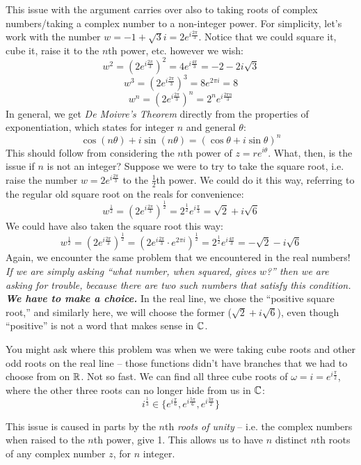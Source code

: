 \documentclass[12pt]{scrartcl}
\begin{document}
This issue with the argument carries over also to taking roots of complex numbers/taking a complex number to a non-integer power. For simplicity, let's work with the number $w = -1 + \sqrt{3} i = 2 e^{i\frac{2\pi}{3}}$. Notice that we could square it, cube it, raise it to the $n$th power, etc. however we wish:
\[
	w^2 = \left(2 e^{i\frac{2\pi}{3}} \right)^2 = 4 e^{i \frac{4\pi}{3}} = -2 - 2i \sqrt{3}
\]
\[
	w^3 = \left(2 e^{i\frac{2\pi}{3}}\right)^3 = 8 e^{2\pi i} = 8
\]
\[
	w^n = \left(2 e^{i\frac{2\pi}{3}} \right)^n = 2^n e^{i \frac{2\pi n}{3}}
\]
In general, we get \textit{De Moivre's Theorem} directly from the properties of exponentiation, which states for integer $n$ and general $\theta$:
\[
	\cos(n\theta) + i \sin (n\theta) = \left(\cos \theta + i \sin \theta \right)^n
\]
This should follow from considering the $n$th power of $z = re^{i \theta}$. What, then, is the issue if $n$ is not an integer? Suppose we were to try to take the square root, i.e. raise the number $w = 2 e^{i\frac{2\pi}{3}}$ to the $\frac{1}{2}$th power. We could do it this way, referring to the regular old square root on the reals for convenience:
\[
	w^\frac{1}{2} = \left(2 e^{i\frac{2\pi}{3}} \right)^\frac{1}{2} = 2^\frac{1}{2} e^{i \frac{\pi}{3}} = \sqrt{2} + i \sqrt{6}
\]
We could have also taken the square root this way:
\[
	w^\frac{1}{2} = \left(2 e^{i\frac{2\pi}{3}} \right)^\frac{1}{2} = \left(2 e^{i\frac{2\pi}{3}} \cdot e^{2\pi i} \right)^\frac{1}{2} = 2^\frac{1}{2} e^{i \frac{4\pi}{3}} = -\sqrt{2} - i \sqrt{6}
\]
Again, we encounter the same problem that we encountered in the real numbers! \textit{If we are simply asking ``what number, when squared, gives $w$?'' then we are asking for trouble, because there are two such numbers that satisfy this condition. \textbf{We have to make a choice.}} In the real line, we chose the ``positive square root,'' and similarly here, we will choose the former ($\sqrt{2} + i \sqrt{6}$), even though ``positive'' is not a word that makes sense in $\mathbb C$.

You might ask where this problem was when we were taking cube roots and other odd roots on the real line -- those functions didn't have branches that we had to choose from on $\mathbb R$. Not so fast. We can find all three cube roots of $\omega = i = e^{i\frac{\pi}{2}}$, where the other three roots can no longer hide from us in $\mathbb C$:
\[
	i^\frac{1}{3} \in \{e^{i \frac{\pi}{6}}, e^{i \frac{5\pi}{6}}, e^{i \frac{3\pi}{2}} \}
\]

This issue is caused in parts by the $n$th \textit{roots of unity} -- i.e. the complex numbers when raised to the $n$th power, give 1. This allows us to have $n$ distinct $n$th roots of any complex number $z$, for $n$ integer.
\end{document}
